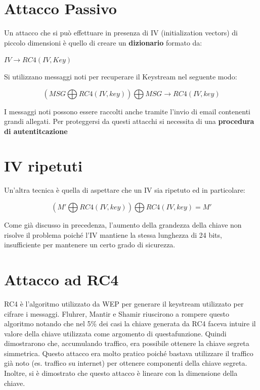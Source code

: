 \documentclass{book}
\theoremstyle{remark}
\begin{document}
\section{Attacco Passivo}
Un attacco che si può effettuare in presenza di IV (initialization vectors) di piccolo dimensioni è quello di creare un \textbf{dizionario} formato da:
\begin{center}
	\(IV\rightarrow RC4(IV,Key)\)
\end{center}
Si utilizzano messaggi noti per recuperare il Keystream nel seguente modo:
\begin{center}
	\begin{equation}
		(MSG\bigoplus RC4(IV,key))\bigoplus MSG\rightarrow RC4(IV,key)
	\end{equation}
\end{center}
I messaggi noti possono essere raccolti anche tramite l'invio di email contenenti grandi allegati\@. Per proteggersi da questi attacchi si necessita di una \textbf{procedura di autentitcazione}
\section{IV ripetuti}
Un'altra tecnica è quella di aspettare che un IV sia ripetuto ed in particolare:
\begin{center}
	\begin{equation}
		(M'\bigoplus RC4(IV,key))\bigoplus RC4(IV,key)=M'
	\end{equation}
\end{center}
Come già discusso in precedenza, l'aumento della grandezza della chiave non risolve il problema poiché l'IV mantiene la stessa lunghezza di 24 bits, insufficiente per mantenere un certo grado di sicurezza\@.
\section{Attacco ad RC4}
RC4 è l'algoritmo utilizzato da WEP per generare il keystream utilizzato per cifrare i messaggi\@. Fluhrer, Mantir e Shamir riuscirono a rompere questo algoritmo notando che nel 5\% dei casi la chiave generata da RC4 faceva intuire il valore della chiave utilizzata come argomento di questafunzione\@. Quindi dimostrarono che, accumulando traffico, era possibile ottenere la chiave segreta simmetrica\@.
Questo attacco era molto pratico poiché bastava utilizzare il traffico già noto (es\@. traffico su internet) per ottenere componenti della chiave segreta\@. Inoltre, si è dimostrato che questo attacco è lineare con la dimensione della chiave\@.
\end{document}
